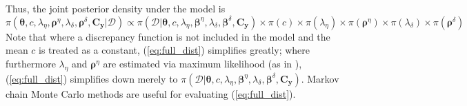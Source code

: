 \documentclass{article}
\begin{document}
Thus, the joint posterior density under the model is
%
\begin{equation} \label{eq:full_dist}
\pi(\boldsymbol \theta,c,\lambda_\eta,\boldsymbol \rho^\eta,\lambda_\delta,\boldsymbol \rho^\delta,\mathbf C_{\mathbf y}|\mathcal D)
\propto \pi(\mathcal D | \boldsymbol \theta,c,\lambda_\eta, \boldsymbol \beta^\eta,\lambda_\delta,\boldsymbol \beta^\delta,\mathbf C_{\mathbf y}) \times \pi(c) \times \pi(\lambda_\eta) \times 
\pi(\boldsymbol \rho^\eta) \times \pi(\lambda_\delta) \times \pi(\boldsymbol \rho^\delta)
\end{equation}
%
Note that where a discrepancy function is not included in the model and the mean $c$ is treated as a constant, (\ref{eq:full_dist}) simplifies greatly; where furthermore $\lambda_\eta$ and $\boldsymbol \rho^\eta$ are estimated via maximum likelihood (as in  \cite{Kennedy2001}),  (\ref{eq:full_dist}) simplifies down merely to 
%
$\pi(\mathcal D | \boldsymbol \theta,c,\lambda_\eta, \boldsymbol \beta^\eta,\lambda_\delta,\boldsymbol \beta^\delta,\mathbf C_{\mathbf y})$. 
%
Markov chain Monte Carlo methods are useful for evaluating (\ref{eq:full_dist}).
\end{document}
